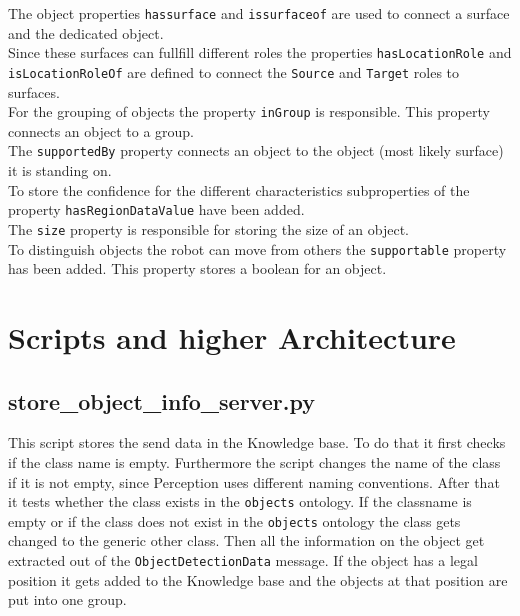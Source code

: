 \documentclass[main.tex]{subfiles}
\begin{document}
The object properties \texttt{hassurface} and \texttt{issurfaceof} are used to connect a surface and the dedicated object.\\
Since these surfaces can fullfill different roles the properties \texttt{hasLocationRole} and \texttt{isLocationRoleOf} are defined to connect the \texttt{Source} and \texttt{Target} roles to surfaces.\\
For the grouping of objects the property \texttt{inGroup} is responsible. This property connects an object to a group.\\
The \texttt{supportedBy} property connects an object to the object (most likely surface) it is standing on.\\
To store the confidence for the different characteristics subproperties of the property \texttt{hasRegionDataValue} have been added.\\
The \texttt{size} property is responsible for storing the size of an object.\\
To distinguish objects the robot can move from others the \texttt{supportable} property has been added. This property stores a boolean for an object.



\section{Scripts and higher Architecture}
\subsection{store\_object\_info\_server.py}
This script stores the send data in the Knowledge base.
To do that it first checks if the class name is empty. Furthermore the script changes the name of the class if it is not empty, since Perception uses different naming conventions. After that it tests whether the class exists in the \texttt{objects} ontology. If the classname is empty or if the class does not exist in the \texttt{objects} ontology the class gets changed to the generic other class. Then all the information on the object get extracted out of the \texttt{ObjectDetectionData} message. If the object has a legal position it gets added to the Knowledge base and the objects at that position are put into one group.

	\endgroup
\end{document}
